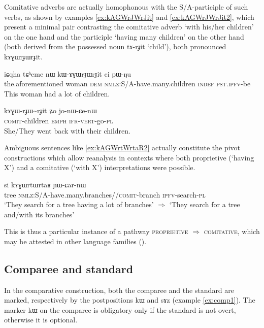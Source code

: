 \documentclass[oldfontcommands,oneside,a4paper,11pt]{article}
\newcommand{\ipa}[1]{\mbox{\phon #1}} %
\newcommand{\tld}{\textasciitilde{}}
\begin{document}
Comitative adverbs are actually homophonous with the S/A-participle of such verbs, as shown by examples \ref{ex:kAGWrJWrJit} and \ref{ex:kAGWrJWrJit2}, which present a minimal pair contrasting the comitative adverb  `with his/her children' on the one hand and the participle  `having many children' on the other hand (both derived from the possessed noun  \ipa{tɤ-rɟit} `child'), both pronounced \ipa{kɤɣɯrɟɯrɟit}.

\begin{exe}
\ex \label{ex:kAGWrJWrJit}
\gll   
\ipa{iɕqha} 	\ipa{tɕʰeme} 	\ipa{nɯ} 	\ipa{kɯ-ɤɣɯrɟɯrɟit} 	\ipa{ci} 	\ipa{pɯ-ŋu}  \\
the.aforementioned woman \textsc{dem} \textsc{nmlz}:S/A-have.many.children \textsc{indef} \textsc{pst.ipfv}-be \\
\glt This woman had a lot of children.
\end{exe}

\begin{exe}
\ex \label{ex:kAGWrJWrJit2}
\gll   
\ipa{kɤɣɯ-rɟɯ\tld{}rɟit} 	\ipa{ʑo} 	\ipa{jo-nɯ-ɕe-nɯ} \\
\textsc{comit}-children \textsc{emph} \textsc{ifr-vert}-go-\textsc{pl} \\
\glt She/They went back with their children.
\end{exe}

Ambiguous sentences like \ref{ex:kAGWrtWrtaR2} actually constitute the pivot constructions which allow reanalysis in contexts where both proprietive (`having X') and a comitative (`with X') interpretations were possible.


  \begin{exe}
\ex \label{ex:kAGWrtWrtaR2}
\gll   
  \ipa{si} 	\ipa{kɤɣɯrtɯrtaʁ} \ipa{ɲɯ-ɕar-nɯ} \\
  tree \textsc{nmlz}:S/A-have.many.branches//\textsc{comit}-branch \textsc{ipfv}-search-\textsc{pl} \\
\glt `They search for a tree having a lot of branches' $\Rightarrow$ `They search for a tree and/with its branches'
\end{exe}

This is thus a particular instance of a pathway \textsc{proprietive} $\Rightarrow$ \textsc{comitative}, which may be attested in other language families (\citealt{stassen00and, stolz06comitative, arkhipov09comitative}).

\subsection{Comparee and standard}
In the comparative construction, both the comparee and the standard are marked, respectively by the postpositions \ipa{kɯ} and \ipa{sɤz}  (example \ref{ex:comp1}). The marker \ipa{kɯ} on the comparee is obligatory only if the standard is not overt, otherwise it is optional.
\end{document}

